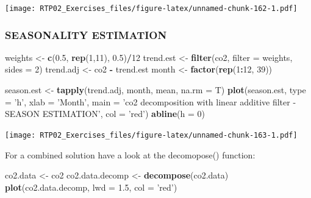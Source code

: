 \documentclass[
]{article}
\newenvironment{Shaded}{\begin{snugshade}}{\end{snugshade}}
\newcommand{\DataTypeTok}[1]{\textcolor[rgb]{0.13,0.29,0.53}{#1}}
\newcommand{\DecValTok}[1]{\textcolor[rgb]{0.00,0.00,0.81}{#1}}
\newcommand{\FloatTok}[1]{\textcolor[rgb]{0.00,0.00,0.81}{#1}}
\newcommand{\KeywordTok}[1]{\textcolor[rgb]{0.13,0.29,0.53}{\textbf{#1}}}
\newcommand{\NormalTok}[1]{#1}
\newcommand{\OperatorTok}[1]{\textcolor[rgb]{0.81,0.36,0.00}{\textbf{#1}}}
\newcommand{\StringTok}[1]{\textcolor[rgb]{0.31,0.60,0.02}{#1}}
\begin{document}
\texttt{[image: RTP02\_Exercises\_files/figure-latex/unnamed-chunk-162-1.pdf]}

\hypertarget{seasonality-estimation}{%
\subsubsection{SEASONALITY ESTIMATION}\label{seasonality-estimation}}

\begin{Shaded}
\begin{Highlighting}[]
\NormalTok{weights <-}\StringTok{ }\KeywordTok{c}\NormalTok{(}\FloatTok{0.5}\NormalTok{, }\KeywordTok{rep}\NormalTok{(}\DecValTok{1}\NormalTok{,}\DecValTok{11}\NormalTok{), }\FloatTok{0.5}\NormalTok{)}\OperatorTok{/}\DecValTok{12}
\NormalTok{trend.est <-}\StringTok{ }\KeywordTok{filter}\NormalTok{(co2, }\DataTypeTok{filter =}\NormalTok{ weights, }\DataTypeTok{sides =} \DecValTok{2}\NormalTok{)}
\NormalTok{trend.adj <-}\StringTok{ }\NormalTok{co2 }\OperatorTok{-}\StringTok{ }\NormalTok{trend.est}
\NormalTok{month <-}\StringTok{ }\KeywordTok{factor}\NormalTok{(}\KeywordTok{rep}\NormalTok{(}\DecValTok{1}\OperatorTok{:}\DecValTok{12}\NormalTok{, }\DecValTok{39}\NormalTok{))}

\NormalTok{season.est <-}\StringTok{ }\KeywordTok{tapply}\NormalTok{(trend.adj, month, mean, }\DataTypeTok{na.rm =}\NormalTok{ T)}
\KeywordTok{plot}\NormalTok{(season.est, }\DataTypeTok{type =} \StringTok{'h'}\NormalTok{, }\DataTypeTok{xlab =} \StringTok{'Month'}\NormalTok{, }\DataTypeTok{main =} \StringTok{'co2 decomposition with linear additive filter - SEASON ESTIMATION'}\NormalTok{, }\DataTypeTok{col =} \StringTok{'red'}\NormalTok{)}
\KeywordTok{abline}\NormalTok{(}\DataTypeTok{h =} \DecValTok{0}\NormalTok{)}
\end{Highlighting}
\end{Shaded}

\texttt{[image: RTP02\_Exercises\_files/figure-latex/unnamed-chunk-163-1.pdf]}

For a combined solution have a look at the decomopose() function:

\begin{Shaded}
\begin{Highlighting}[]
\NormalTok{co2.data <-}\StringTok{ }\NormalTok{co2}
\NormalTok{co2.data.decomp <-}\StringTok{ }\KeywordTok{decompose}\NormalTok{(co2.data)}
\KeywordTok{plot}\NormalTok{(co2.data.decomp, }\DataTypeTok{lwd =} \FloatTok{1.5}\NormalTok{, }\DataTypeTok{col =} \StringTok{'red'}\NormalTok{)}
\end{Highlighting}
\end{Shaded}
\end{document}
